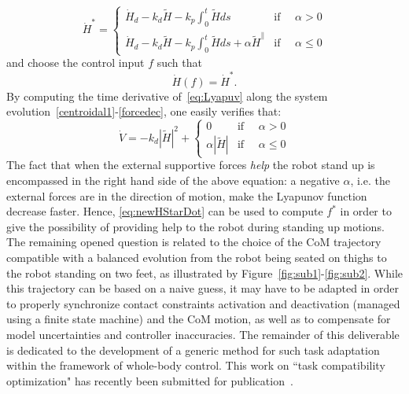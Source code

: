 \documentclass[12pt,a4paper,twoside]{article}
\begin{document}
\begin{equation}
\label{eq:newHStarDot}
  \dot{H}^* =
  \begin{cases}
    \dot{H}_d - k_d\tilde{H} -k_p \int_0^t\tilde{H} ds & \text{if }\quad  \alpha > 0
    \\
   \dot{H}_d - k_d\tilde{H} -k_p \int_0^t\tilde{H} ds +\alpha\tilde{H}^\parallel & \text{if }\quad  \alpha \leq 0
  \end{cases}
\end{equation}
and choose the control input $f$ such that 
\[ \dot{H}(f) = \dot{H}^*. \]
By computing the time derivative of~\eqref{eq:Lyapuv} along the system evolution~\eqref{centroidal1}-\eqref{forcedec}, one easily verifies that:
\begin{equation}
\label{eq:newVDot}
 \dot{V} =-k_d|\tilde{H}|^2 +
  \begin{cases}
   0 & \text{if }\quad  \alpha > 0
    \\
   \alpha|\tilde{H}| & \text{if }\quad  \alpha \leq 0
  \end{cases}
\end{equation}
The fact that when the external supportive forces \emph{help} the robot stand up is encompassed in the right hand side of the above equation:  a negative $\alpha$, i.e. the external forces are in the direction of motion, make the Lyapunov function decrease faster. Hence, \eqref{eq:newHStarDot} can be used to compute $f^*$ in order to give the possibility of providing help to the robot during standing up motions.\\

The remaining opened question is related to the choice of the CoM trajectory compatible with a balanced evolution from the robot being seated on  thighs to the robot standing on two feet, as illustrated by Figure~\ref{fig:sub1}-\ref{fig:sub2}. While this trajectory can be based on a naive guess, it may have to be adapted in order to properly synchronize contact constraints activation and deactivation (managed using a finite state machine) and the CoM motion, as well as to compensate for model uncertainties and controller inaccuracies. The remainder of this deliverable is dedicated to the development of a generic method for such task adaptation within the framework of whole-body control. This work on ``task compatibility optimization" has recently been submitted for publication~\cite{lober2017RAL-IROS}.
\end{document}
